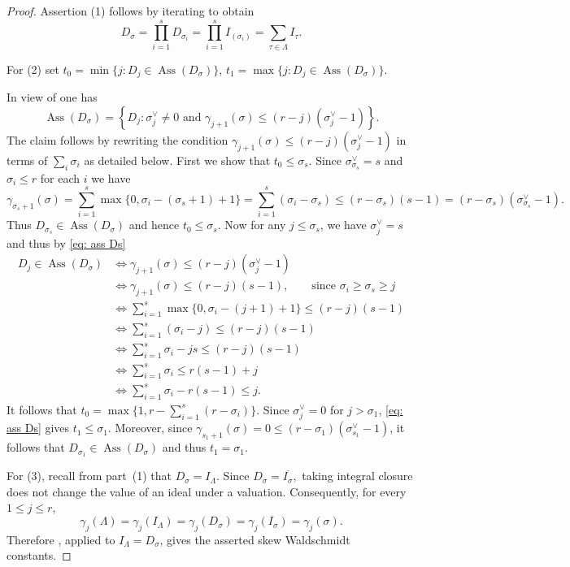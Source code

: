 \documentclass[11pt, reqno]{amsart}
\numberwithin{equation}{section}
\theoremstyle{definition}
\DeclareMathOperator{\Ass}{Ass}
\newcommand{\s}{\sigma}
\begin{document}
	\begin{proof}

	Assertion (1) follows by iterating  to obtain \[
D_\sigma=\prod_{i=1}^s D_{\sigma_i} =\prod_{i=1}^s I_{(\sigma_i)}=\sum_{\tau \in \Lambda} I_{\tau}.
\]

For (2)  set  $t_0=\min\{j: D_j\in \Ass(D_\s)\}$, $t_1=\max\{j: D_j\in \Ass(D_\s)\}$.

 In view of \cite[Theorem 7.2]{deconcini1980young} one has
\begin{equation}\label{eq: ass Ds}
\Ass(D_\s)=\left \{D_j: \s^\vee_j\neq 0 \text{ and } \gamma_{j+1}(\s)\leq (r-j)(\s^\vee_j-1)\right\}.
\end{equation}
The claim follows by
rewriting the condition $\gamma_{j+1}(\s)\leq (r-j)(\s^\vee_j-1)$ in terms of $\sum_i\sigma_i$ as detailed below. First we show that $t_0 \leqslant \sigma_s$.  Since $\s^\vee_{\s_s}=s$ and $\sigma_i\leq r$ for each $i$ we have
\[
\gamma_{\sigma_s+1}(\sigma)=\sum_{i=1}^s \max \{0, \sigma_i -(\sigma_s+1)+1\}=\sum_{i=1}^s(\sigma_i-\sigma_s) \leqslant (r-\sigma_s)(s-1)=(r-\sigma_s)(\s^\vee_{\s_s}-1).
\]
Thus  $D_{\sigma_s} \in \Ass(D_{\sigma})$ and hence $t_0 \leqslant \sigma_s$.
		Now for any $j \leq \sigma_s$, we have $\s^\vee_{j}=s$ and thus by \eqref{eq: ass Ds}
		\begin{align*}
			D_j \in \Ass(D_\sigma) &\iff \gamma_{j+1}(\sigma) \leqslant (r-j)(\s^\vee_j-1)\\
			& \iff \gamma_{j+1}(\sigma) \leqslant (r-j)(s-1), \qquad \text{since } \sigma_i \geqslant \sigma_s \geq j \\
			& \iff  \sum_{i=1}^{s}\max\{0, \sigma_i-(j+1)+1 \}\leqslant (r-j)(s-1)\\
			& \iff \sum_{i=1}^{s}(\sigma_i-j) \leqslant (r-j)(s-1)\\
			&\iff \sum_{i=1}^s\sigma_i -js \leqslant (r-j)(s-1)\\
			&\iff \sum_{i=1}^s\sigma_i  \leqslant r(s-1)+j\\
			&\iff \sum_{i=1}^s\sigma_i - r(s-1) \leqslant j.
\end{align*}
It follows that $t_0=\max\{1, r- \sum_{i=1}^s (r-\sigma_i)\}$.
 Since $\s^\vee_j=0$ for $j>\s_1$, \eqref{eq: ass Ds} gives  $t_1\leq \s_1$. Moreover, since $\gamma_{s_1+1}(\s)=0\leq (r-\s_1)(\s^\vee_{s_1}-1)$, it follows that $D_{\s_1}\in \Ass(D_\s)$ and thus $t_1=\s_1$.

For (3), recall from part~(1) that $D_\sigma=I_\Lambda$. Since
$
D_\sigma=\overline{I_\sigma},
$
taking integral closure does not change the value of an ideal under a valuation. Consequently, for every $1\leq j\leq r$,
\[
\gamma_j(\Lambda)
=\gamma_j(I_\Lambda)
=\gamma_j(D_\sigma)
=\gamma_j(I_\sigma)
=\gamma_j(\sigma).
\]
Therefore , applied to $I_\Lambda=D_\sigma$, gives the asserted skew Waldschmidt constants.


\end{proof}
\end{document}
